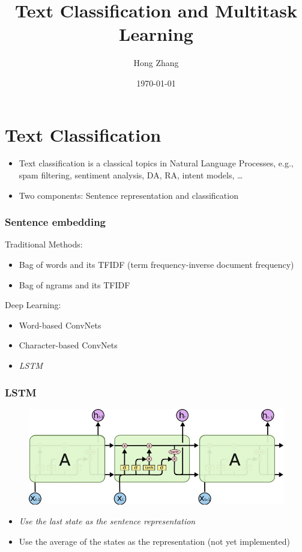 \documentclass{beamer}
\title[prediction and learning]{Text Classification and Multitask Learning} %
\author{Hong Zhang} %
\institute[Yahoo!] %
{
Yahoo Researh \\ %
\medskip
}
\date{\today} %
\begin{document}
\begin{frame}
\titlepage
\end{frame}
\begin{frame}
\tableofcontents
\end{frame}

\section{Text Classification}
\begin{frame}
\begin{itemize}
\item Text classification is a classical topics in Natural Language Processes, e.g., spam filtering,
sentiment analysis,  DA, RA, intent models, \ldots
\item Two components: Sentence representation and classification 
\end{itemize}
\end{frame}



\begin{frame}
\frametitle{Sentence embedding}
Traditional Methods:
\begin{itemize}
\item Bag of words and its TFIDF (term frequency-inverse document frequency)
\item Bag of ngrams and its TFIDF
\end{itemize}
Deep Learning:
\begin{itemize}
\item Word-based ConvNets
\item Character-based ConvNets
\item {\textit{LSTM}} 
\end{itemize}

\end{frame}


\begin{frame}
\frametitle{LSTM}
\begin{figure}
\includegraphics[scale = 0.3]{LSTM.jpg}
\end{figure}
\begin{itemize}
\item \textit{Use the last state as the sentence representation} 
\item Use the average of the states as the representation (not yet implemented)
\end{itemize}

\end{frame}
\end{document}

